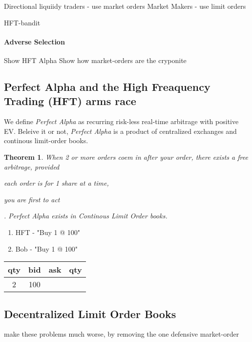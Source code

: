 \documentclass[12pt]{article}
\newtheorem{theorem}{Theorem}
\begin{document}
Directional liquiidy traders - use market orders  
Market Makers - use limit orders 

HFT-bandit  

\paragraph*{Adverse Selection}

Show HFT Alpha 
Show how market-orders are the cryponite  


\subsection*{Perfect Alpha and the High Freaquency Trading (HFT) arms race}
We define \emph{Perfect Alpha} as recurring risk-less real-time arbitrage with positive EV. Beleive it or not, \emph{Perfect Alpha} is a product of centralized exchanges and continous limit-order books. 


\begin{theorem}
    When 2 or more orders coem in after your order, there exists a free arbitrage, provided  \begin {enumerate*} [1) ]%
    \item each order is for 1 share at a time, \item you are first to act \end {enumerate*}. 
    Perfect Alpha exists in Continous Limit Order books. 
\end{theorem}



      \begin{enumerate}
        \item HFT - "Buy 1 @ 100"
        \item Bob - "Buy 1 @ 100"  
      \end{enumerate}
    
      \begin{center}
        \begin{tabular}{ |c|c|c|c| }
        \hline
        qty & bid & ask & qty \\
        \hline
        2 & 100 &  &  \\
        \hline
        \end{tabular}
      \end{center}
    
\subsection{Decentralized Limit Order Books} make these problems much worse, by removing the one defensive market-order 
\end{document}
